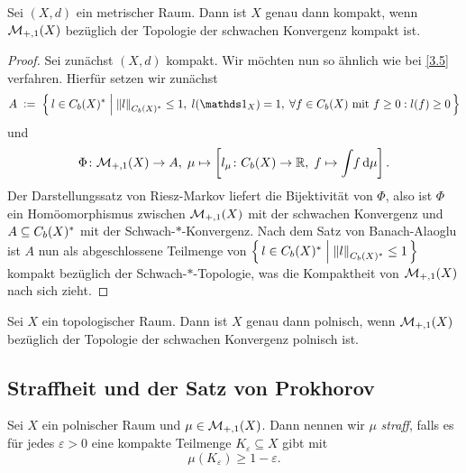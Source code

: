 \documentclass[../main/main.tex]{subfiles}
\begin{document}
	\begin{Satz}
		\label{thm:compactequivalence}
		Sei $(X, d)$ ein metrischer Raum. Dann ist $X$ genau dann kompakt, wenn $\mathcal{M}_{+,1}(X)$ 
		bezüglich der Topologie der schwachen Konvergenz kompakt ist.
	\end{Satz}


	\begin{proof}
		Sei zunächst $(X, d)$ kompakt. Wir möchten nun so ähnlich wie bei \eqref{3.5} verfahren.
		Hierfür setzen wir zunächst
		\[ A \; \defby \; \setcomp{l \in \Bdcontfct{X}^\ast}{\norm{l}_{\Bdcontfct{X}^\ast} \leq 1, \; l(\indfct_{X}) = 1, \; 
			\forall f \in \Bdcontfct{X} \text{ mit } f \geq 0 : l(f) \geq 0}\]
		und
		\[ \Phi \colon \mathcal{M}_{+,1}(X) \to A, \; \mu \mapsto \left[l_\mu \colon C_b(X) \to \mathbb{R}, \; f \mapsto \int_{} \, f \, \mathrm{d}\mu \right]  \text{.} \]
		Der Darstellungssatz von Riesz-Markov liefert die Bijektivität von $\Phi$, also ist $\Phi$ ein 
		Homöomorphismus zwischen $\mathcal{M}_{+,1}(X)$ mit der schwachen Konvergenz und $A \subseteq C_b(X)^\ast$ 
		mit der Schwach-$\ast$-Konvergenz. Nach dem Satz von Banach-Alaoglu ist $A$ nun als abgeschlossene Teilmenge von 
		$\left\{\, l \in C_b(X)^\ast \; \middle| \; \left\lVert l\right\rVert_{C_b(X)^\ast} \leq 1 \,\right\}$ kompakt bezüglich der Schwach-$\ast$-Topologie, 
		was die Kompaktheit von $\mathcal{M}_{+,1}(X)$ nach sich zieht.
	\end{proof}


	\begin{Satz}
		Sei $X$ ein topologischer Raum. Dann ist $X$ genau dann polnisch, wenn $\mathcal{M}_{+,1}(X)$ bezüglich der 
		Topologie der schwachen Konvergenz polnisch ist.
	\end{Satz}
	
	\subsection{Straffheit und der Satz von Prokhorov}
	\label{subsec:prokhorov}
	
	\begin{Definition}
		Sei $X$ ein polnischer Raum und $\mu \in \mathcal{M}_{+,1}(X)$. Dann nennen wir 
		$\mu$ \emph{straff}, falls es für jedes $\varepsilon > 0$ eine kompakte Teilmenge
		$K_\varepsilon \subseteq X$ gibt mit 
		\[ \mu(K_\varepsilon) \geq 1  - \varepsilon \text{.} \]
	\end{Definition}
	
\end{document}
